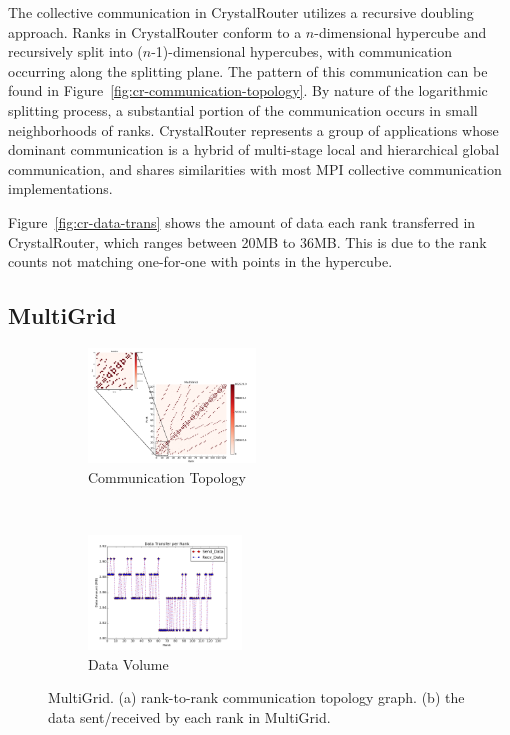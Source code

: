 \documentclass[conference]{IEEEtran}
\begin{document}
The collective communication in CrystalRouter utilizes a recursive doubling approach. Ranks in CrystalRouter conform to a $n$-dimensional hypercube and recursively split into ($n$-1)-dimensional hypercubes, with communication occurring along the splitting plane. The pattern of this communication can be found in Figure~\ref{fig:cr-communication-topology}. By nature of the logarithmic splitting process, a substantial portion of the communication occurs in small neighborhoods of ranks. CrystalRouter represents a group of applications whose dominant communication is a hybrid of multi-stage local and hierarchical global communication, and shares similarities with most MPI collective communication implementations.

Figure~\ref{fig:cr-data-trans} shows the amount of data each rank transferred in CrystalRouter, which ranges between 20MB to 36MB. This is due to the rank counts not matching one-for-one with points in the hypercube.

\subsection{MultiGrid}
\label{sec:multigrid}

\begin{figure}[t!]
    \centering
    \begin{subfigure}[t]{0.22\textwidth}
        \centering
        \includegraphics[height=1.2in]{figs/appstudy/mg/mg_pip}
        \caption{Communication Topology}
        \label{fig:mg-communication-topology}
    \end{subfigure}
    ~
    \begin{subfigure}[t]{0.22\textwidth}
        \centering
        \includegraphics[height=1.2in]{figs/appstudy/mg/mg_data_transfer}
        \caption{Data Volume}
        \label{fig:mg-data-trans}
    \end{subfigure}
    \caption{MultiGrid. (a) rank-to-rank communication topology graph. (b) the data sent/received by each rank in MultiGrid.}
\end{figure}
\end{document}
